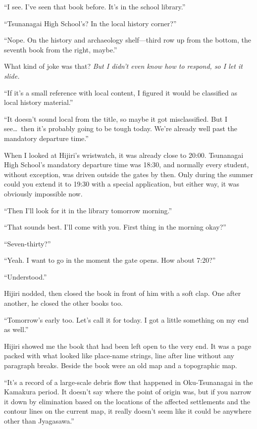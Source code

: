 \documentclass[
    a4paper,
    12pt,
    twoside,
    openany,
    UTF8,
    fontset=windows
]{ctexbook}
\begin{document}
``I see. I've seen that book before. It's in the school library.''

``Tsunanagai High School's? In the local history corner?''

``Nope. On the history and archaeology shelf---third row up from the bottom, the seventh book from the right, maybe.''


What kind of joke was that? \textit{But I didn't even know how to respond, so I let it slide.}

``If it's a small reference with local content, I figured it would be classified as local history material.''

``It doesn't sound local from the title, so maybe it got misclassified. But I see\dots\ then it's probably going to be tough today. We're already well past the mandatory departure time.''

When I looked at Hijiri's wristwatch, it was already close to 20:00. Tsunanagai High School's mandatory departure time was 18:30, and normally every student, without exception, was driven outside the gates by then. Only during the summer could you extend it to 19:30 with a special application, but either way, it was obviously impossible now.

``Then I'll look for it in the library tomorrow morning.''

``That sounds best. I'll come with you. First thing in the morning okay?''

``Seven-thirty?''

``Yeah. I want to go in the moment the gate opens. How about 7:20?''

``Understood.''

Hijiri nodded, then closed the book in front of him with a soft clap. One after another, he closed the other books too.

``Tomorrow's early too. Let's call it for today. I got a little something on my end as well.''

Hijiri showed me the book that had been left open to the very end. It was a page packed with what looked like place-name strings, line after line without any paragraph breaks. Beside the book were an old map and a topographic map.

``It's a record of a large-scale debris flow that happened in Oku-Tsunanagai in the Kamakura period. It doesn't say where the point of origin was, but if you narrow it down by elimination based on the locations of the affected settlements and the contour lines on the current map, it really doesn't seem like it could be anywhere other than Jyagasawa.''
\end{document}
